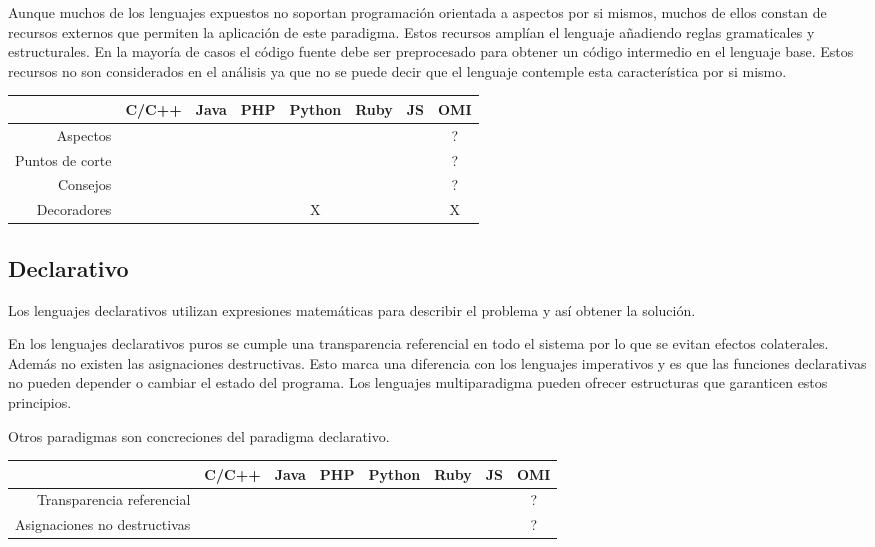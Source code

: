 Aunque muchos de los lenguajes expuestos no soportan programación orientada a aspectos
por si mismos, muchos de ellos constan de recursos externos que permiten 
la aplicación de este paradigma. Estos recursos amplían el lenguaje 
añadiendo reglas gramaticales y estructurales. En la mayoría de casos 
el código fuente debe ser preprocesado para obtener un código intermedio
en el lenguaje base. Estos recursos no son considerados en el análisis 
ya que no se puede decir que el lenguaje contemple esta característica por si mismo.

\FloatBarrier
\begin{table}[h]
\begin{center}
 
\begin{tabular}{|r|c|c|c|c|c|c|c|} \hline
 & C/C++ & Java & PHP  & Python & Ruby & JS & OMI\\ \hline
Aspectos & & &  &  &  &  & ? \\ \hline
Puntos de corte & & & &  &  &  & ? \\ \hline
Consejos   & & & & & & & ? \\ \hline
Decoradores   & & & & X & & & X \\ \hline
\end{tabular}
\end{center}
\end{table}
\FloatBarrier

\subsection {Declarativo}
Los lenguajes declarativos utilizan expresiones matemáticas para describir el problema y así obtener la solución.  

En los lenguajes declarativos puros se cumple una transparencia referencial en todo el sistema por lo
que se evitan efectos colaterales. Además no existen las asignaciones destructivas. Esto marca una diferencia 
con los lenguajes imperativos y es que las funciones declarativas no pueden depender o cambiar el estado del 
programa. Los lenguajes multiparadigma pueden ofrecer estructuras que garanticen estos principios.

Otros paradigmas son concreciones del paradigma declarativo.

\FloatBarrier
\begin{table}[h]
\begin{center}
\begin{tabular}{|r|c|c|c|c|c|c|c|} \hline
 & C/C++ & Java & PHP  & Python & Ruby & JS & OMI\\ \hline
Transparencia referencial & & &  &  &  &  & ? \\ \hline
Asignaciones no destructivas & & &  &  &  &  & ? \\ \hline
\end{tabular}
\end{center}
\end{table}
\FloatBarrier

